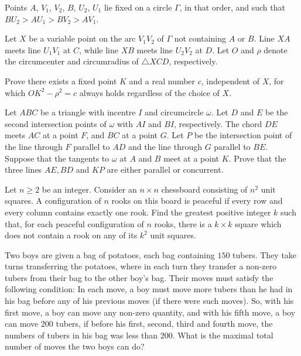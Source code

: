 \documentclass[11pt]{scrartcl}
\begin{document}
\begin{problem}[315159980103862]
	Points $A$, $V_1$, $V_2$, $B$, $U_2$, $U_1$ lie fixed on a circle $\Gamma$, in that order, and such that $BU_2 > AU_1 > BV_2 > AV_1$.

Let $X$ be a variable point on the arc $V_1 V_2$ of $\Gamma$ not containing $A$ or $B$. Line $XA$ meets line $U_1 V_1$ at $C$, while line $XB$ meets line $U_2 V_2$ at $D$. Let $O$ and $\rho$ denote the circumcenter and circumradius of $\triangle XCD$, respectively.

Prove there exists a fixed point $K$ and a real number $c$, independent of $X$, for which $OK^2 - \rho^2 = c$ always holds regardless of the choice of $X$.
\end{problem}
\begin{problem}[315251261850257]
Let $ABC$ be a triangle with incentre $I$ and circumcircle $\omega$. Let $D$ and $E$ be the second intersection points of $\omega$ with $AI$ and $BI$, respectively. The chord $DE$ meets $AC$ at a point $F$, and $BC$ at a point $G$. Let $P$ be the intersection point of the line through $F$ parallel to $AD$ and the line through $G$ parallel to $BE$. Suppose that the tangents to $\omega$ at $A$ and $B$ meet at a point $K$. Prove that the three lines $AE,BD$ and $KP$ are either parallel or concurrent.
\end{problem}
\begin{problem}[317862961000833]
Let $n \ge 2$ be an integer. Consider an $n \times n$ chessboard consisting of $n^2$ unit squares. A configuration of $n$ rooks on this board is peaceful if every row and every column contains exactly one rook. Find the greatest positive integer $k$ such that, for each peaceful configuration of $n$ rooks, there is a $k \times k$ square which does not contain a rook on any of its $k^2$ unit squares.
\end{problem}
\begin{problem}[326164407850848]
Two boys are given a bag of potatoes, each bag containing $150$ tubers. They take turns transferring the potatoes, where in each turn they transfer a non-zero tubers from their bag to the other boy's bag. Their moves must satisfy the following condition: In each move, a boy must move more tubers than he had in his bag before any of his previous moves (if there were such moves). So, with his first move, a boy can move any non-zero quantity, and with his fifth move, a boy can move $200$ tubers, if before his first, second, third and fourth move, the numbers of tubers in his bag was less than $200$. What is the maximal total number of moves the two boys can do?
\end{problem}
\end{document}
